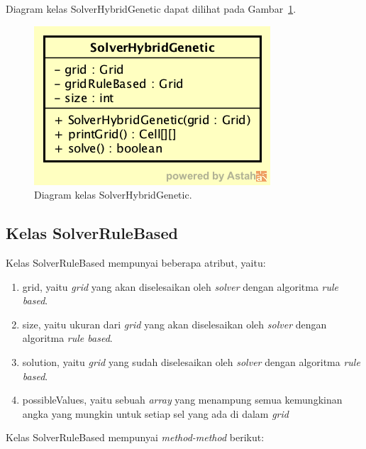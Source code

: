 Diagram kelas SolverHybridGenetic dapat dilihat pada Gambar~\ref{fig:diagramkelassolverhg}.

\begin{figure}
\centering
\captionsetup{justification=centering}
\includegraphics[scale=0.5]{Gambar/Perancangan/DiagramKelasSolverHybridGenetic.png}
\caption[Diagram kelas SolverHybridGenetic.]{Diagram kelas SolverHybridGenetic.}
\label{fig:diagramkelassolverhg}
\end{figure}

\subsection{Kelas SolverRuleBased}
\label{sec:kelassolverrb}

Kelas SolverRuleBased mempunyai beberapa atribut, yaitu:

\begin{enumerate}
\item grid, yaitu \textit{grid} yang akan diselesaikan oleh \textit{solver} dengan algoritma \textit{rule based}.
\item size, yaitu ukuran dari \textit{grid} yang akan diselesaikan oleh \textit{solver} dengan algoritma \textit{rule based}.
\item solution, yaitu \textit{grid} yang sudah diselesaikan oleh \textit{solver} dengan algoritma \textit{rule based}.
\item possibleValues, yaitu sebuah \textit{array} yang menampung semua kemungkinan angka yang mungkin untuk setiap sel yang ada di dalam \textit{grid}
\end{enumerate}

Kelas SolverRuleBased mempunyai \textit{method-method} berikut:

